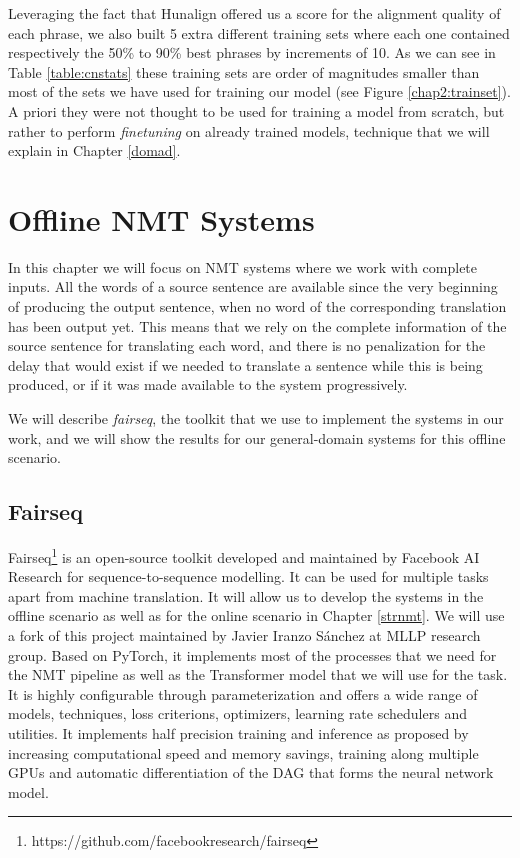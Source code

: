 \documentclass[11pt,english,listoffigures,listoftables]{tfgetsinf}
\begin{document}
Leveraging the fact that Hunalign offered us a score for the alignment quality of each phrase, we also built 5 extra different training sets where each one contained respectively the 50\% to 90\% best phrases by increments of 10.
As we can see in Table \ref{table:cnstats} these training sets are order of magnitudes smaller than most of the sets we have used for training our model (see Figure \ref{chap2:trainset}). A priori they were not thought to be used for training a model from scratch, but rather to perform \textit{finetuning} on already trained models, technique that we will explain in Chapter \ref{domad}. 

\chapter{Offline NMT Systems}\label{systems}
In this chapter we will focus on NMT systems where we work with complete inputs. All the words of a source sentence are available since the very beginning of producing the output sentence, when no word of the corresponding translation has been output yet. This means that we rely on the complete information of the source sentence for translating each word, and there is no penalization for the delay that would exist 
if we needed to translate a sentence while this is being produced, or if it was made available to the system progressively. 

We will describe \textit{fairseq}, the toolkit that we use to implement the systems in our work, and we will show the results for our general-domain systems for this offline scenario.

\section{Fairseq}\label{fairseq}
Fairseq\footnote{https://github.com/facebookresearch/fairseq} \cite{ott-etal-2019-fairseq} is an open-source toolkit developed and maintained by Facebook AI Research for sequence-to-sequence modelling. It can be used for multiple tasks apart from machine translation. It will allow us to develop the systems in the offline scenario as well as for the online scenario in Chapter \ref{strnmt}. 
We will use a fork of this project maintained by Javier Iranzo Sánchez at MLLP research group. Based on PyTorch, it implements most of the processes that we need for the NMT pipeline as well as the Transformer model that we will use for the task. It is highly configurable through parameterization and offers a wide range of models, techniques, loss criterions, optimizers, learning rate schedulers and utilities. It implements half precision training and inference as proposed by \cite{DBLP:journals/corr/abs-1806-00187} increasing computational speed and memory savings, training along multiple GPUs and automatic differentiation of the DAG that forms the neural network model. 
\end{document}

